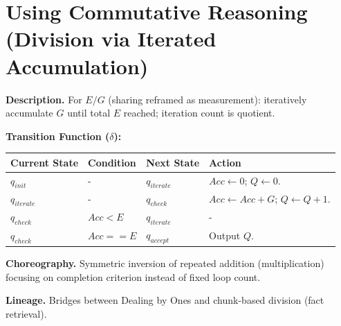 \documentclass[12pt]{book}
\begin{document}
\section{Using Commutative Reasoning (Division via Iterated
Accumulation)}\label{using-commutative-reasoning-division-via-iterated-accumulation}

\textbf{Description.} For \(E / G\) (sharing reframed as measurement):
iteratively accumulate \(G\) until total \(E\) reached; iteration count
is quotient.

\textbf{Transition Function (\(\delta\)):}

\begin{longtable}[]{@{}
  >{\raggedright\arraybackslash}p{}
  >{\raggedright\arraybackslash}p{}
  >{\raggedright\arraybackslash}p{}
  >{\raggedright\arraybackslash}p{}@{}}
\toprule\noalign{}
\begin{minipage}[b]{\linewidth}\raggedright
Current State
\end{minipage} & \begin{minipage}[b]{\linewidth}\raggedright
Condition
\end{minipage} & \begin{minipage}[b]{\linewidth}\raggedright
Next State
\end{minipage} & \begin{minipage}[b]{\linewidth}\raggedright
Action
\end{minipage} \\
\midrule\noalign{}
\endhead
\bottomrule\noalign{}
\endlastfoot
\(q_{init}\) & - & \(q_{iterate}\) & \(Acc \leftarrow 0\);
\(Q \leftarrow 0\). \\
\(q_{iterate}\) & - & \(q_{check}\) & \(Acc \leftarrow Acc + G\);
\(Q \leftarrow Q + 1\). \\
\(q_{check}\) & \(Acc < E\) & \(q_{iterate}\) & - \\
\(q_{check}\) & \(Acc == E\) & \(q_{accept}\) & Output \(Q\). \\
\end{longtable}

\textbf{Choreography.} Symmetric inversion of repeated addition
(multiplication) focusing on completion criterion instead of fixed loop
count.

\textbf{Lineage.} Bridges between Dealing by Ones and chunk-based
division (fact retrieval).
\end{document}
